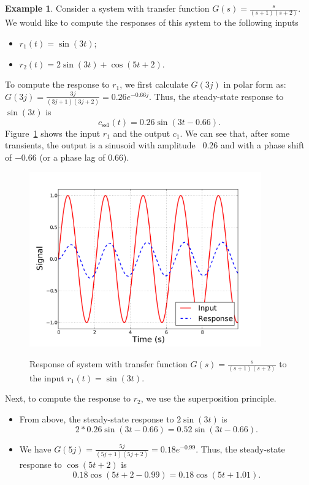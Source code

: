 \documentclass[a4paper,11pt]{report}
\theoremstyle{definition}
\newtheorem{mdexample}{Example}
\newenvironment{example}%
  {\vspace{0.1cm}\begin{mdframed}[backgroundcolor=lightgray]\begin{mdexample}}%
  {\end{mdexample}\end{mdframed}\vspace{0.1cm}}
\begin{document}
\begin{example}
  Consider a system with transfer function
  $G(s)=\frac{s}{(s+1)(s+2)}$. We would like to compute the responses
  of this system to the following inputs
  \begin{itemize}
  \item $r_1(t) = \sin(3t)$;
  \item $r_2(t) = 2\sin(3t) + \cos(5t+2)$.
  \end{itemize}

  To compute the response to $r_1$, we first calculate $G(3j)$ in
  polar form as: $G(3j)=\frac{3j}{(3j+1)(3j+2)}=0.26e^{-0.66j}$. Thus,
  the steady-state response to $\sin(3t)$ is
  \[
  c_\mathrm{ss1}(t) = 0.26\sin(3t-0.66).
  \]
  Figure~\ref{fig:sine-resp} shows the input $r_1$ and the output
  $c_1$. We can see that, after some transients, the output is a
  sinusoid with amplitude ~0.26 and with a phase shift of $-0.66$ (or
  a phase lag of $0.66$).

  \begin{figure}[H]
    \centering
    \includegraphics[width=10cm]{fig/sine-resp.pdf}\\
    \caption{Response of system with transfer function
      $G(s)=\frac{s}{(s+1)(s+2)}$ to the input $r_1(t) = \sin(3t)$.}
    \label{fig:sine-resp}
  \end{figure}

  Next, to compute the response to $r_2$, we use the superposition
  principle.
  \begin{itemize}
  \item From above, the steady-state response to
    $2\sin(3t)$ is  
    \[
    2*0.26\sin(3t-0.66) = 0.52\sin(3t-0.66).
    \]
  \item We have $G(5j)=\frac{5j}{(5j+1)(5j+2)}=0.18e^{-0.99}$. Thus,
    the steady-state response to $\cos(5t+2)$ is
    \[
    0.18\cos(5t+2-0.99) = 0.18\cos(5t+1.01).
    \]
  \end{itemize}


\end{example}
\end{document}
